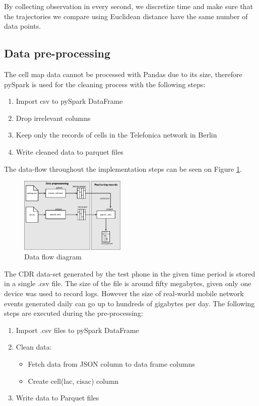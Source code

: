 By collecting observation in every second, we discretize time and make sure that the trajectories we compare using Euclidean distance have the same number of data points.

\subsection{Data pre-processing}
The cell map data cannot be processed with Pandas due to its size, therefore pySpark is used for the cleaning process with the following steps: 
\begin{enumerate}
    \item Import csv to pySpark DataFrame
    \item Drop irrelevant columns
    \item Keep only the records of cells in the Telefonica network in Berlin
    \item Write cleaned data to parquet files
\end{enumerate}

The data-flow throughout the implementation steps can be seen on Figure \ref{fig:data-flow}.
\begin{figure}[h]
    \centering
    \includegraphics[width=0.45\textwidth]{images/data-flow.png}
    \caption{Data flow diagram}
    \label{fig:data-flow}
\end{figure}

The CDR data-set generated by the test phone in the given time period is stored in a single .csv file. The size of the file is around fifty megabytes, given only one device was used to record logs. However the size of real-world mobile network events generated daily can go up to hundreds of gigabytes per day. The following steps are executed during the pre-processing: 
\begin{enumerate}
   \item Import .csv files to pySpark DataFrame
    \item Clean data:
    \begin{itemize}
        \item Fetch data from JSON column to data frame columns
        \item Create cell(lac, cisac) column
    \end{itemize}
    \item Write data to Parquet files
\end{enumerate}

